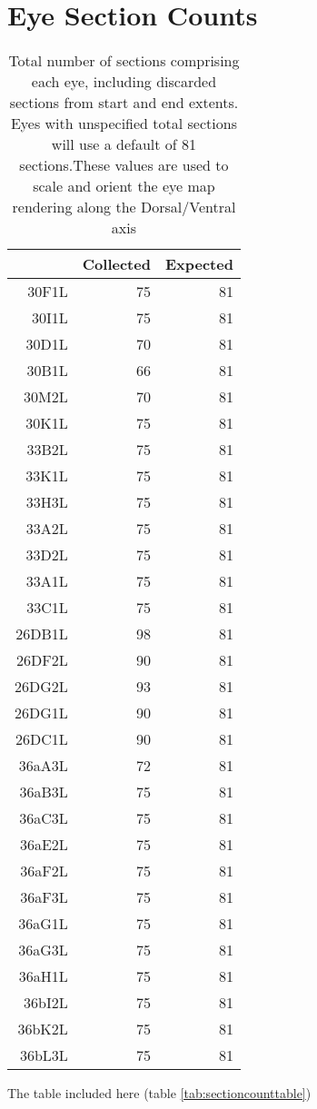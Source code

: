 \documentclass{article}
\begin{document}
\section{Eye Section Counts}

\begin{table}[ht]
\centering
\begin{tabular}{rrr}
  \hline
 & Collected & Expected \\ 
  \hline
30F1L &  75 &  81 \\ 
  30I1L &  75 &  81 \\ 
  30D1L &  70 &  81 \\ 
  30B1L &  66 &  81 \\ 
  30M2L &  70 &  81 \\ 
  30K1L &  75 &  81 \\ 
  33B2L &  75 &  81 \\ 
  33K1L &  75 &  81 \\ 
  33H3L &  75 &  81 \\ 
  33A2L &  75 &  81 \\ 
  33D2L &  75 &  81 \\ 
  33A1L &  75 &  81 \\ 
  33C1L &  75 &  81 \\ 
  26DB1L &  98 &  81 \\ 
  26DF2L  &  90 &  81 \\ 
  26DG2L &  93 &  81 \\ 
  26DG1L &  90 &  81 \\ 
  26DC1L &  90 &  81 \\ 
  36aA3L &  72 &  81 \\ 
  36aB3L &  75 &  81 \\ 
  36aC3L &  75 &  81 \\ 
  36aE2L &  75 &  81 \\ 
  36aF2L &  75 &  81 \\ 
  36aF3L &  75 &  81 \\ 
  36aG1L &  75 &  81 \\ 
  36aG3L &  75 &  81 \\ 
  36aH1L &  75 &  81 \\ 
  36bI2L &  75 &  81 \\ 
  36bK2L &  75 &  81 \\ 
  36bL3L &  75 &  81 \\ 
   \hline
\end{tabular}
\caption{Total number of sections comprising each eye, including discarded sections from start and end extents. Eyes with unspecified total sections will use a default of 81 sections.These values are used to scale and orient the eye map rendering along the Dorsal/Ventral axis} 
\label{sectioncounttable}
\end{table}The table included here (table \ref{tab:sectioncounttable}) 
\clearpage
\end{document}
